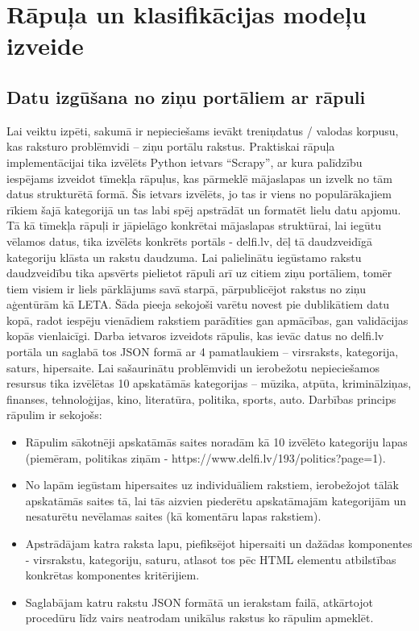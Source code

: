 \chapter{Rāpuļa un klasifikācijas modeļu izveide}
\section{Datu izgūšana no ziņu portāliem ar rāpuli}
Lai veiktu izpēti, sakumā ir nepieciešams ievākt treniņdatus / valodas korpusu, kas raksturo problēmvidi – ziņu portālu rakstus. Praktiskai rāpuļa implementācijai tika izvēlēts Python ietvars “Scrapy”, ar kura palīdzību iespējams izveidot tīmekļa rāpuļus, kas pārmeklē mājaslapas un izvelk no tām datus strukturētā formā. Šis ietvars izvēlēts, jo tas ir viens no populārākajiem rīkiem šajā kategorijā un tas labi spēj apstrādāt un formatēt lielu datu apjomu. Tā kā tīmekļa rāpuļi ir jāpielāgo konkrētai mājaslapas struktūrai, lai iegūtu vēlamos datus, tika izvēlēts konkrēts portāls - delfi.lv, dēļ tā daudzveidīgā kategoriju klāsta un rakstu daudzuma. Lai palielinātu iegūstamo rakstu daudzveidību tika apsvērts pielietot rāpuli arī uz citiem ziņu portāliem, tomēr tiem visiem ir liels pārklājums savā starpā, pārpublicējot rakstus no ziņu aģentūrām kā LETA. Šāda pieeja sekojoši varētu novest pie dublikātiem datu kopā, radot iespēju vienādiem rakstiem parādīties gan apmācības, gan validācijas kopās vienlaicīgi. Darba ietvaros izveidots rāpulis, kas ievāc datus no delfi.lv portāla un saglabā tos JSON formā ar 4 pamatlaukiem – virsraksts, kategorija, saturs, hipersaite. Lai sašaurinātu problēmvidi un ierobežotu nepieciešamos resursus tika izvēlētas 10 apskatāmās kategorijas – mūzika, atpūta, kriminālziņas, finanses, tehnoloģijas, kino, literatūra, politika, sports, auto. Darbības princips rāpulim ir sekojošs:
\begin{itemize}
\item Rāpulim sākotnēji apskatāmās saites noradām kā 10 izvēlēto kategoriju lapas (piemēram, politikas ziņām - https://www.delfi.lv/193/politics?page=1).
\item No lapām iegūstam hipersaites uz individuāliem rakstiem, ierobežojot tālāk apskatāmās saites tā, lai tās aizvien piederētu apskatāmajām kategorijām un nesaturētu nevēlamas saites (kā komentāru lapas rakstiem).
\item Apstrādājam katra raksta lapu, piefiksējot hipersaiti un dažādas komponentes - virsrakstu, kategoriju, saturu, atlasot tos pēc HTML elementu atbilstības konkrētas komponentes kritērijiem.
\item Saglabājam katru rakstu JSON formātā un ierakstam failā, atkārtojot procedūru līdz vairs neatrodam unikālus rakstus ko rāpulim apmeklēt.
\end{itemize}

